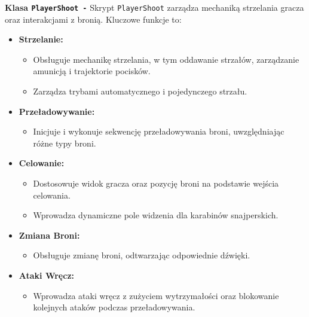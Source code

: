 \textbf{Klasa \texttt{PlayerShoot -}}
Skrypt \texttt{PlayerShoot} zarządza mechaniką strzelania gracza oraz interakcjami z bronią. Kluczowe funkcje to:
\begin{itemize}
  \item \textbf{Strzelanie:}
    \begin{itemize}
      \item Obsługuje mechanikę strzelania, w tym oddawanie strzałów, zarządzanie amunicją i trajektorie pocisków.
      \item Zarządza trybami automatycznego i pojedynczego strzału.
    \end{itemize}
  \item \textbf{Przeładowywanie:}
    \begin{itemize}
      \item Inicjuje i wykonuje sekwencję przeładowywania broni, uwzględniając różne typy broni.
    \end{itemize}
  \item \textbf{Celowanie:}
    \begin{itemize}
      \item Dostosowuje widok gracza oraz pozycję broni na podstawie wejścia celowania.
      \item Wprowadza dynamiczne pole widzenia dla karabinów snajperskich.
    \end{itemize}
  \item \textbf{Zmiana Broni:}
    \begin{itemize}
      \item Obsługuje zmianę broni, odtwarzając odpowiednie dźwięki.
    \end{itemize}
  \item \textbf{Ataki Wręcz:}
    \begin{itemize}
      \item Wprowadza ataki wręcz z zużyciem wytrzymałości oraz blokowanie kolejnych ataków podczas przeładowywania.
    \end{itemize}
\end{itemize}

